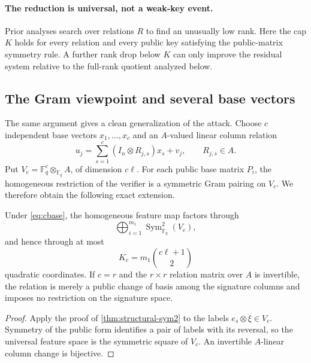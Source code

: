 \documentclass[runningheads]{llncs}
\newcommand{\F}{\mathbb F}
\newcommand{\Sym}{\operatorname{Sym}}
\begin{document}
\paragraph{The reduction is universal, not a weak-key event.}
Prior analyses search over relations $R$ to find an unusually low rank.  Here the cap $K$ holds for every relation and every public key satisfying the public-matrix symmetry rule.  A further rank drop below $K$ can only improve the residual system relative to the full-rank quotient analyzed below.

\subsection{The Gram viewpoint and several base vectors}\label{sec:gram}

The same argument gives a clean generalization of the attack.  Choose
$c$ independent base vectors $x_1,\ldots,x_c$ and an $A$-valued linear
column relation
\begin{equation}\label{eq:cbase}
 u_j=\sum_{s=1}^{c}(I_n\otimes R_{j,s})x_s+v_j,
 \qquad R_{j,s}\in A.
\end{equation}
Put $V_c=\F_q^c\otimes_{\F_q}A$, of dimension $c\ell$.  For each public
base matrix $P_i$, the homogeneous restriction of the verifier is a symmetric
Gram pairing on $V_c$.  We therefore obtain the following exact extension.

\begin{proposition}\label{prop:cbase}
Under \cref{eq:cbase}, the homogeneous feature map factors through
\[
 \bigoplus_{i=1}^{m_1}\Sym^2_{\F_q}(V_c),
\]
and hence through at most
\[
 K_c=m_1\binom{c\ell+1}{2}
\]
quadratic coordinates.  If $c=r$ and the $r\times r$ relation matrix over
$A$ is invertible, the relation is merely a public change of basis among the
signature columns and imposes no restriction on the signature space.
\end{proposition}

\begin{proof}
Apply the proof of \cref{thm:structural-sym2} to the labels
$e_s\otimes\xi\in V_c$.  Symmetry of the public form identifies a pair of
labels with its reversal, so the universal feature space is the symmetric
square of $V_c$.  An invertible $A$-linear column change is bijective.
\end{proof}
\end{document}
